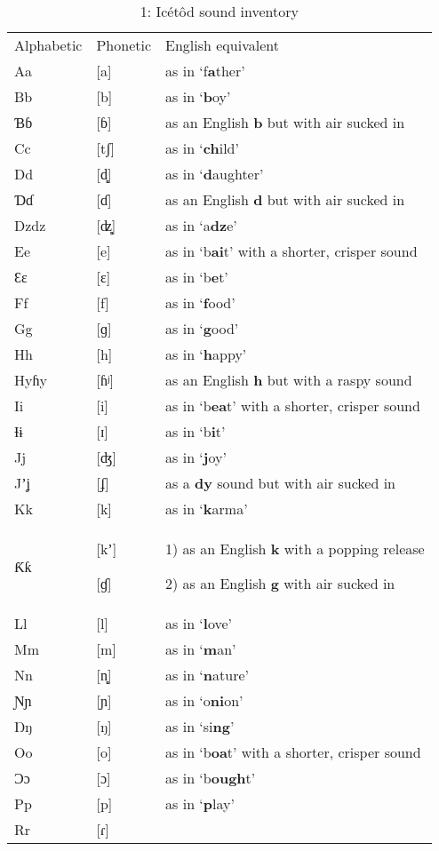 \begin{table}
\caption{1: Icétôd sound inventory}
\label{tab:2}

\begin{tabularx}{\textwidth}{XXX}
\lsptoprule

Alphabetic & Phonetic & English equivalent\\
Aa & [a] & as in ‘f\textbf{a}ther’\\
Bb & [b] & as in ‘\textbf{b}oy’\\
Ɓɓ & [ɓ] & as an English \textbf{b }but with air sucked in\\
Cc & [tʃ] & as in ‘\textbf{ch}ild’\\
Dd & [d̻] & as in ‘\textbf{d}aughter’\\
Ɗɗ & [ɗ] & as an English \textbf{d }but with air sucked in\\
Dzdz & [ʣ̻] & as in ‘a\textbf{dz}e’\\
Ee & [e] & as in ‘b\textbf{ai}t’ with a shorter, crisper sound\\
Ɛɛ & [ɛ] & as in ‘b\textbf{e}t’\\
Ff & [f] & as in ‘\textbf{f}ood’\\
Gg & [ɡ] & as in ‘\textbf{g}ood’\\
Hh & [h] & as in ‘\textbf{h}appy’\\
Hyɦy & [ɦʲ] & as an English \textbf{h }but with a raspy sound\\
Ii & [i] & as in ‘b\textbf{ea}t’ with a shorter, crisper sound\\
Ɨɨ & [ɪ] & as in ‘b\textbf{i}t’\\
Jj & [ʤ] & as in ‘\textbf{j}oy’\\
Jʼʝ & [ʄ] & as a \textbf{dy} sound but with air sucked in\\
Kk & [k] & as in ‘\textbf{k}arma’\\
Ƙƙ & [kʼ]

[ɠ] & 1) as an English \textbf{k }with a popping release

2) as an English \textbf{g }with air sucked in\\
Ll & [l] & as in ‘\textbf{l}ove’\\
Mm & [m] & as in ‘\textbf{m}an’\\
Nn & [n̻] & as in ‘\textbf{n}ature’\\
Ɲɲ & [ɲ] & as in ‘o\textbf{ni}on’\\
Ŋŋ & [ŋ] & as in ‘si\textbf{ng}’\\
Oo & [o] & as in ‘b\textbf{oa}t’ with a shorter, crisper sound\\
Ɔɔ & [ɔ] & as in ‘b\textbf{ough}t’\\
Pp & [p] & as in ‘\textbf{p}lay’\\
Rr & [ɾ]


\end{tabularx}
\end{table}
